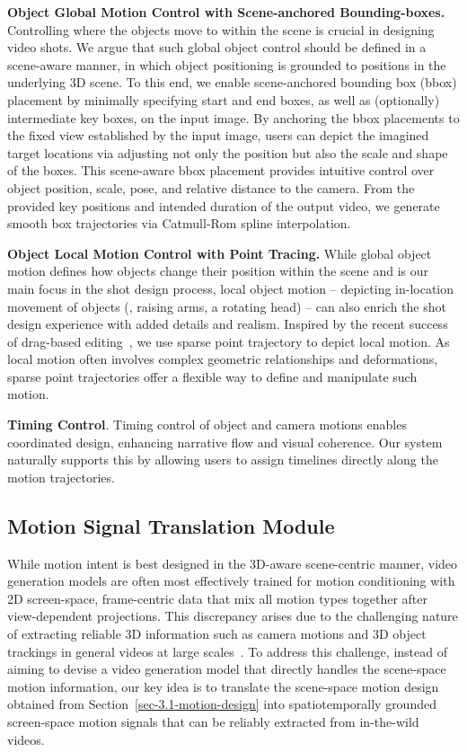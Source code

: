 \textbf{Object Global Motion Control with Scene-anchored Bounding-boxes.}
Controlling where the objects move to within the scene is crucial in designing video shots. 
We argue that such global object control should be defined in a scene-aware manner, in which object positioning is grounded to positions in the underlying 3D scene.
To this end, we enable scene-anchored bounding box (bbox) placement by minimally specifying start and end boxes, as well as (optionally) intermediate key boxes, on the input image. 
By anchoring the bbox placements to the fixed view established by the input image, users can depict the imagined target locations via adjusting not only the position but also the scale and shape of the boxes. This scene-aware bbox placement provides intuitive control over object position, scale, pose, and relative distance to the camera.
From the provided key positions and intended duration of the output video, we generate smooth box trajectories via Catmull-Rom spline interpolation.



\textbf{Object Local Motion Control with Point Tracing.}
While global object motion defines how objects change their position within the scene and is our main focus in the shot design process, local object motion -- depicting in-location movement of objects (\eg, raising arms, a rotating head) -- can also enrich the shot design experience with added details and realism.
Inspired by the recent success of drag-based editing~\cite{mou2024revideo}, we use sparse point trajectory to depict local motion. As local motion often involves complex geometric relationships and deformations, sparse point trajectories offer a flexible way to define and manipulate such motion.

\textbf{Timing Control}.
Timing control of object and camera motions enables coordinated design, enhancing narrative flow and visual coherence. Our system naturally supports this by allowing users to assign timelines directly along the motion trajectories.

\subsection{Motion Signal Translation Module}


While motion intent is best designed in the 3D-aware scene-centric manner, video generation models are often most effectively trained for motion conditioning with 2D screen-space, frame-centric data that mix all motion types together after view-dependent projections. 
This discrepancy arises due to the challenging nature of extracting reliable 3D information such as camera motions and 3D object trackings in general videos at large scales~\cite{zhou2018stereo}. 
To address this challenge, instead of aiming to devise a video generation model that directly handles the scene-space motion information, our key idea is to translate the scene-space motion design obtained from Section~\ref{sec-3.1-motion-design} into spatiotemporally grounded screen-space motion signals that can be reliably extracted from in-the-wild videos. 

